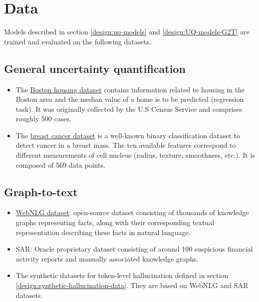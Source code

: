 



\section{Data} \label{section:datasets}
Models described in section \ref{design:uq-models} and \ref{design:UQ-models-G2T} are trained and evaluated on the following datasets.

\subsection{General uncertainty quantification}

\begin{itemize}
    \item The \href{https://www.cs.toronto.edu/~delve/data/boston/bostonDetail.html}{Boston housing dataset} contains information related to housing in the Boston area and the median value of a home is to be predicted (regression task). It was originally collected by the U.S Census Service and comprises roughly 500 cases.
    \item The \href{https://archive.ics.uci.edu/ml/datasets/breast+cancer+wisconsin+(diagnostic)}{breast cancer dataset} is a well-known binary classification dataset to detect cancer in a breast mass. The ten available features correspond to different measurements of cell nucleus (radius, texture, smoothness, etc.). It is composed of 569 data points.
\end{itemize}

\subsection{Graph-to-text}
\begin{itemize}
    \item \href{https://webnlg-challenge.loria.fr/challenge_2020/}{WebNLG dataset}: open-source dataset consisting of thousands of knowledge graphs representing facts, along with their corresponding textual representation describing these facts in natural language.
    \item SAR: Oracle proprietary dataset consisting of around 100 suspicious financial activity reports and manually associated knowledge graphs.
    \item The synthetic datasets for token-level hallucination defined in section \ref{design:synthetic-hallucination-data}. They are based on WebNLG and SAR datasets.
\end{itemize}

